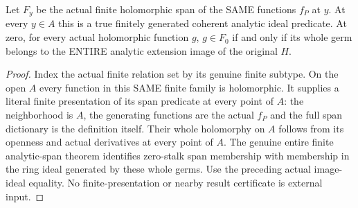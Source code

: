 \begin{theorem}
\label{hir:relative-normal-deformation-finite-functional-model}
\leanok
{}
Let $F_y$ be the actual finite holomorphic span of the SAME functions $f_P$
at $y$. At every $y\in A$ this is a true finitely generated coherent analytic
ideal predicate. At zero, for every actual holomorphic function $g$,
$g\in F_0$ if and only if its whole germ belongs to the ENTIRE analytic
extension image of the original $H$.
\end{theorem}
\begin{proof}
Index the actual finite relation set by its genuine finite subtype. On the
open $A$ every function in this SAME finite family is holomorphic. It supplies
a literal finite presentation of its span predicate at every point of $A$:
the neighborhood is $A$, the generating functions are the actual $f_P$ and
the full span dictionary is the definition itself. Their whole holomorphy
on $A$ follows from its openness and actual derivatives at every point of $A$.
The genuine entire finite analytic-span theorem identifies zero-stalk span
membership with membership in the ring ideal generated by these whole germs.
Use the preceding actual image-ideal equality. No finite-presentation or
nearby result certificate is external input.
\end{proof}

